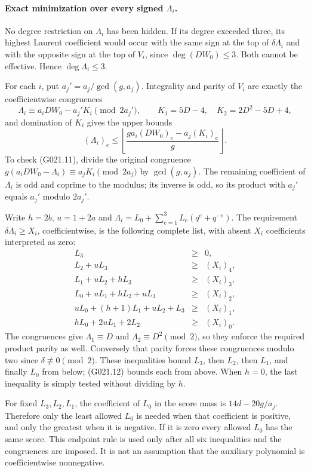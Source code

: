 \paragraph{Exact minimization over every signed $\Lambda_i$.}
No degree restriction on $\Lambda_i$ has been hidden. If its
degree exceeded three, its highest Laurent coefficient would
occur with the same sign at the top of $\delta\Lambda_i$ and
with the opposite sign at the top of $V_i$, since
$\deg(DW_0)\le3$. Both cannot be effective. Hence
$\deg\Lambda_i\le3$.

For each $i$, put $a_j'=a_j/\gcd(g,a_j)$. Integrality and parity
of $V_i$ are exactly the coefficientwise congruences
\[
 \Lambda_i\equiv a_iDW_0-a_j'K_i\pmod{2a_j'},\qquad
 K_1=5D-4,\quad K_2=2D^2-5D+4,                      \tag{G021.11}
\]
and domination of $K_i$ gives the upper bounds
\[
 (\Lambda_i)_e\le
 \left\lfloor\frac{g a_i(DW_0)_e-a_j(K_i)_e}{g}\right\rfloor.
 \tag{G021.12}
\]
To check (G021.11), divide the original congruence
$g(a_iDW_0-\Lambda_i)\equiv a_jK_i\pmod{2a_j}$ by
$\gcd(g,a_j)$. The remaining coefficient of $\Lambda_i$
is odd and coprime to the modulus; its inverse is odd, so its
product with $a_j'$ equals $a_j'$ modulo $2a_j'$.

Write $h=2b$, $u=1+2a$ and
$\Lambda_i=L_0+\sum_{e=1}^3L_e(q^e+q^{-e})$.
The requirement $\delta\Lambda_i\ge X_i$, coefficientwise,
is the following complete list, with absent $X_i$ coefficients
interpreted as zero:
\[
 \begin{array}{rcl}
 L_3&\ge&0,\\
 L_2+uL_3&\ge&(X_i)_4,\\
 L_1+uL_2+hL_3&\ge&(X_i)_3,\\
 L_0+uL_1+hL_2+uL_3&\ge&(X_i)_2,\\
 uL_0+(h+1)L_1+uL_2+L_3&\ge&(X_i)_1,\\
 hL_0+2uL_1+2L_2&\ge&(X_i)_0.
 \end{array}                                           \tag{G021.13}
\]
The congruences give $\Lambda_1\equiv D$ and
$\Lambda_2\equiv D^2\pmod2$, so they enforce the required
product parity as well. Conversely that parity forces these
congruences modulo two since $\delta\not\equiv0\pmod2$.
These inequalities bound $L_3$,
then $L_2$, then $L_1$, and finally $L_0$ from below;
(G021.12) bounds each from above. When $h=0$, the last
inequality is simply tested without dividing by $h$.

For fixed $L_3,L_2,L_1$, the coefficient of $L_0$ in the score
mass is $14d-20g/a_j$. Therefore only the least allowed $L_0$
is needed when that coefficient is positive, and only the
greatest when it is negative. If it is zero every allowed
$L_0$ has the same score. This endpoint rule is used only
after all six inequalities and the congruences are imposed.
It is not an assumption that the auxiliary polynomial is
coefficientwise nonnegative.

